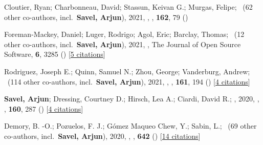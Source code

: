 \item[{\color{numcolor}\scriptsize5}] Cloutier, Ryan; Charbonneau, David; Stassun, Keivan G.; Murgas, Felipe; \etal\ ({62} other co-authors, incl.\ \textbf{Savel, Arjun}), 2021, , \aj, \textbf{162}, 79 ()

\item[{\color{numcolor}\scriptsize4}] Foreman-Mackey, Daniel; Luger, Rodrigo; Agol, Eric; Barclay, Thomas; \etal\ ({12} other co-authors, incl.\ \textbf{Savel, Arjun}), 2021, , The Journal of Open Source Software, \textbf{6}, 3285 () [\href{https://ui.adsabs.harvard.edu/abs/2021JOSS....6.3285F}{5 citations}]

\item[{\color{numcolor}\scriptsize3}] Rodriguez, Joseph E.; Quinn, Samuel N.; Zhou, George; Vanderburg, Andrew; \etal\ ({114} other co-authors, incl.\ \textbf{Savel, Arjun}), 2021, , \aj, \textbf{161}, 194 () [\href{https://ui.adsabs.harvard.edu/abs/2021AJ....161..194R}{4 citations}]

\item[{\color{numcolor}\scriptsize2}] \textbf{Savel, Arjun}; Dressing, Courtney D.; Hirsch, Lea A.; Ciardi, David R.; \etal, 2020, , \aj, \textbf{160}, 287 () [\href{https://ui.adsabs.harvard.edu/abs/2020AJ....160..287S}{4 citations}]

\item[{\color{numcolor}\scriptsize1}] Demory, B. -O.; Pozuelos, F. J.; G{\'o}mez Maqueo Chew, Y.; Sabin, L.; \etal\ ({69} other co-authors, incl.\ \textbf{Savel, Arjun}), 2020, , \aanda, \textbf{642} () [\href{https://ui.adsabs.harvard.edu/abs/2020A&A...642A..49D}{14 citations}]